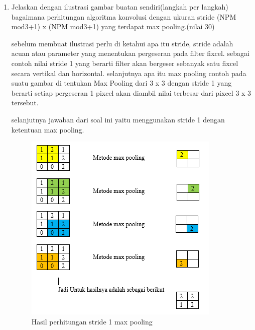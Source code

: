 \begin{enumerate}
\item Jelaskan dengan ilustrasi gambar buatan sendiri(langkah per langkah) bagaimana perhitungan algoritma konvolusi dengan ukuran stride (NPM mod3+1) x (NPM mod3+1) yang terdapat max pooling.(nilai 30)\par
 sebelum membuat ilustrasi perlu di ketahui apa itu stride, stride adalah acuan atau parameter yang menentukan pergeseran pada filter fixcel. sebagai contoh nilai stride 1 yang berarti filter akan bergeser sebanyak satu fixcel secara vertikal dan horizontal. selanjutnya apa itu max pooling contoh pada suatu gambar di tentukan Max Pooling dari 3 x 3 dengan stride 1 yang berarti setiap pergeseran 1 pixcel akan diambil nilai terbesar dari pixcel 3 x 3 tersebut.\par

selanjutnya jawaban dari soal ini yaitu menggunakan stride 1 dengan ketentuan max pooling. 
\begin{figure}[ht]
\centering
\includegraphics[scale=0.4]{figures/1174042/chapter7/1,10.PNG}
\caption{Hasil perhitungan stride 1 max pooling}
\label{Contoh}
\end{figure}

\end{enumerate}

